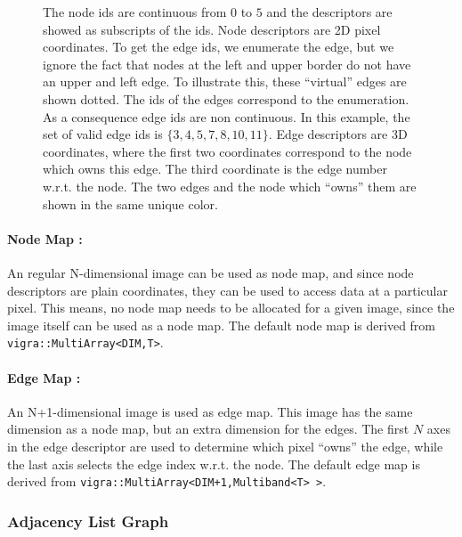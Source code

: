\begin{figure}[H]
{    The node ids are continuous from $0$ to $5$ and the descriptors
    are showed as subscripts of the ids.
    Node descriptors are 2D pixel coordinates.
    To get the edge ids, we enumerate the edge, but we ignore the fact that nodes at the
    left and upper border do
    not have an upper and left edge.
    To illustrate this, these ``virtual'' edges are shown dotted.
    The ids of the edges correspond to the enumeration.
    As a consequence edge ids are non continuous.    
    In this example, 
    the set of valid edge ids is $\{ 3,4,5,7,8,10,11 \}$.
    Edge descriptors are 3D coordinates, where the first two
    coordinates correspond to the node which owns this edge.
    The third coordinate is the edge number w.r.t. the node.
    The two edges and the node which ``owns'' them are
    shown in the same unique color.

}
\end{figure}

\paragraph{Node Map :} An regular N-dimensional image can
be used as node map, and since node descriptors are plain
coordinates, they can be used to access data at a
particular pixel.
This means, no node map needs to be allocated for a given
image, since the image itself can be used as a node map.
The default node map is derived from \lstinline{vigra::MultiArray<DIM,T>}.

\paragraph{Edge Map :} An N+1-dimensional image is
used as edge map.
This image has the same dimension as a node map, but an extra
dimension for the edges.
The first $N$ axes in the edge descriptor are 
used to determine which pixel ``owns'' the edge,
while the last axis selects the edge index w.r.t. the node.
The default edge map is derived from \lstinline{vigra::MultiArray<DIM+1,Multiband<T> >}.



\subsubsection{Adjacency List Graph} \label{sec:graphs_adjacency_list_graph}

